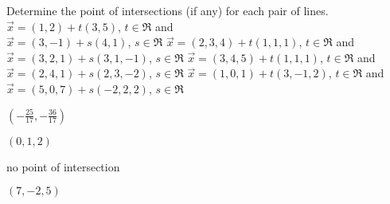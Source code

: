 
\begin{Exercise}[
name={},
title={}, 
difficulty=0,
origin={\cite{SM}}]
Determine the point of intersections (if any) for each pair of lines.
\Question $\vec{x} = (1,2) + t(3,5)$, $t\in\Re$ and\\ $\vec{x} = (3,-1)+s(4,1)$, $s\in\Re$
\Question $\vec{x} = (2,3,4) + t(1,1,1)$, $t\in\Re$ and\\ $\vec{x} = (3,2,1) + s(3,1,-1)$, $s\in\Re$
\Question $\vec{x} = (3,4,5) + t(1,1,1)$, $t\in\Re$ and\\ $\vec{x} = (2,4,1) + s(2,3,-2)$, $s\in\Re$
\Question $\vec{x} = (1,0,1) + t(3,-1,2)$, $t\in\Re$ and\\ $\vec{x} = (5,0,7) + s(-2,2,2)$, $s\in\Re$
\end{Exercise}

\begin{Answer}
\Question $\left(-\frac{25}{17},-\frac{36}{17}\right)$

\Question $(0,1,2)$

\Question no point of intersection

\Question $(7,-2,5)$
\end{Answer}

